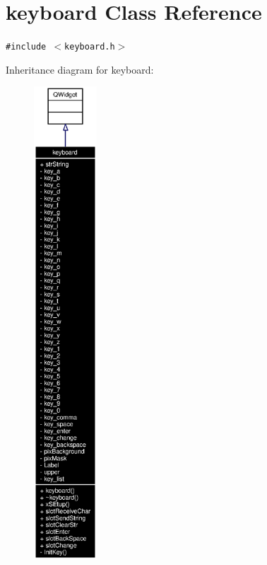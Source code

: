 \section{keyboard Class Reference}
\label{classkeyboard}
{\tt \#include $<$keyboard.h$>$}

Inheritance diagram for keyboard:\begin{figure}[H]
\begin{center}
\leavevmode
\includegraphics[width=67pt]{classkeyboard__inherit__graph}
\end{center}
\end{figure}
